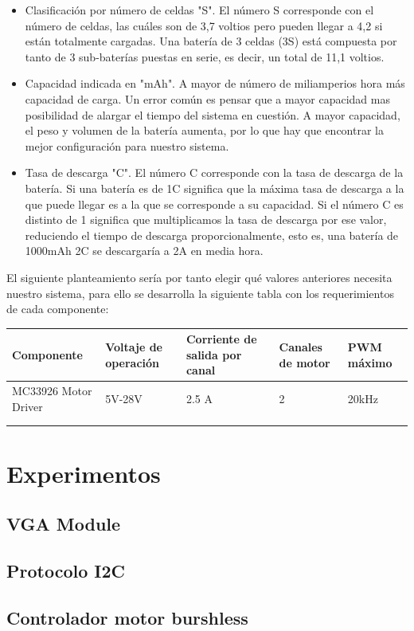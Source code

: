 \begin{itemize}
	\item Clasificación por número de celdas "S". El número S corresponde con el número de celdas, las cuáles son de 3,7 voltios pero pueden llegar a 4,2 si están totalmente cargadas. Una batería de 3 celdas (3S) está compuesta por tanto de 3 sub-baterías puestas en serie, es decir, un total de 11,1 voltios.
	\item Capacidad indicada en "mAh". A mayor de número de miliamperios hora más capacidad de carga. Un error común es pensar que a mayor capacidad mas posibilidad de alargar el tiempo del sistema en cuestión. A mayor capacidad, el peso y volumen de la batería aumenta, por lo que hay que encontrar la mejor configuración para nuestro sistema. 
	\item Tasa de descarga "C". El número C corresponde con la tasa de descarga de la batería. Si una batería es de 1C significa que la máxima tasa de descarga a la que puede llegar es a la que se corresponde a su capacidad. Si el número C es distinto de 1 significa que multiplicamos la tasa de descarga por ese valor, reduciendo el tiempo de descarga proporcionalmente, esto es, una batería de 1000mAh 2C se descargaría a 2A en media hora.
\end{itemize}

El siguiente planteamiento sería por tanto elegir qué valores anteriores necesita nuestro sistema, para ello se desarrolla la siguiente tabla con los requerimientos de cada componente:

\begin{table}[H]
	\begin{tabular}{lllll}
		\hline
		\multicolumn{1}{|l|}{Componente}           & \multicolumn{1}{l|}{Voltaje de operación} & \multicolumn{1}{l|}{Corriente de salida por canal} & \multicolumn{1}{l|}{Canales de motor} & \multicolumn{1}{l|}{PWM máximo} \\ \hline
		\multicolumn{1}{|l|}{MC33926 Motor Driver} & \multicolumn{1}{l|}{5V-28V}               & \multicolumn{1}{l|}{2.5 A}                         & \multicolumn{1}{l|}{2}                & \multicolumn{1}{l|}{20kHz}      \\ \hline
		&                                           &                                                    &                                       &                                 \\
		&                                           &                                                    &                                       &                                
	\end{tabular}
\end{table}


\section{Experimentos}
\subsection{VGA Module}
\subsection{Protocolo I2C}
\subsection{Controlador motor burshless}